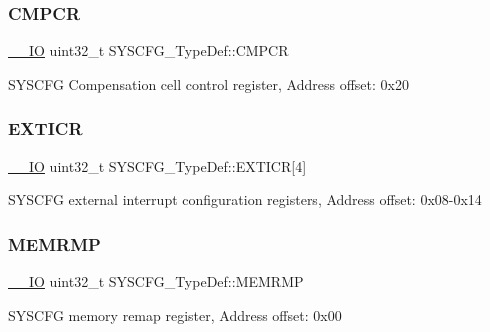 \subsubsection{\texorpdfstring{C\+M\+P\+CR}{CMPCR}}
{\footnotesize\ttfamily \hyperlink{core__sc300_8h_aec43007d9998a0a0e01faede4133d6be}{\+\_\+\+\_\+\+IO} uint32\+\_\+t S\+Y\+S\+C\+F\+G\+\_\+\+Type\+Def\+::\+C\+M\+P\+CR}

S\+Y\+S\+C\+FG Compensation cell control register, Address offset\+: 0x20 \mbox{\label{struct_s_y_s_c_f_g___type_def_a66a06b3aab7ff5c8fa342f7c1994bf7d}} 
\subsubsection{\texorpdfstring{E\+X\+T\+I\+CR}{EXTICR}}
{\footnotesize\ttfamily \hyperlink{core__sc300_8h_aec43007d9998a0a0e01faede4133d6be}{\+\_\+\+\_\+\+IO} uint32\+\_\+t S\+Y\+S\+C\+F\+G\+\_\+\+Type\+Def\+::\+E\+X\+T\+I\+CR\mbox{[}4\mbox{]}}

S\+Y\+S\+C\+FG external interrupt configuration registers, Address offset\+: 0x08-\/0x14 \mbox{\label{struct_s_y_s_c_f_g___type_def_a85b9d3df2274b730327b181c402a7bf5}} 
\subsubsection{\texorpdfstring{M\+E\+M\+R\+MP}{MEMRMP}}
{\footnotesize\ttfamily \hyperlink{core__sc300_8h_aec43007d9998a0a0e01faede4133d6be}{\+\_\+\+\_\+\+IO} uint32\+\_\+t S\+Y\+S\+C\+F\+G\+\_\+\+Type\+Def\+::\+M\+E\+M\+R\+MP}

S\+Y\+S\+C\+FG memory remap register, Address offset\+: 0x00 \mbox{\label{struct_s_y_s_c_f_g___type_def_ab5c47c570566cb8ff9d0436c17cc9241}} 
